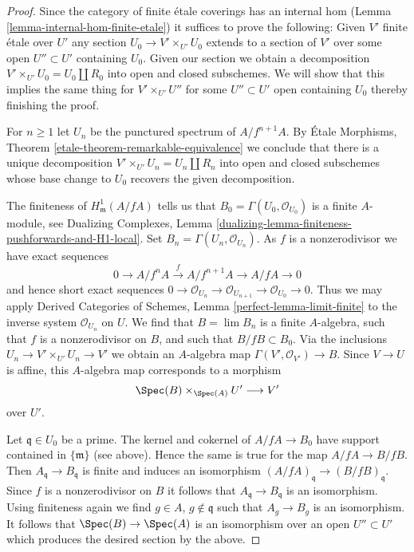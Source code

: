\begin{proof}
Since the category of finite \'etale coverings has an internal hom
(Lemma \ref{lemma-internal-hom-finite-etale})
it suffices to prove the following: Given $V'$ finite \'etale over $U'$
any section $U_0 \to V' \times_{U'} U_0$ extends to a section of $V'$
over some open $U'' \subset U'$ containing $U_0$.
Given our section we obtain a decomposition
$V' \times_{U'} U_0 = U_0 \amalg R_0$ into open and closed subschemes.
We will show that this implies the same thing for $V' \times_{U'} U''$
for some $U'' \subset U'$ open containing $U_0$ thereby
finishing the proof.

\medskip\noindent
For $n \geq 1$ let $U_n$ be the punctured spectrum of $A/f^{n + 1}A$. By
\'Etale Morphisms, Theorem \ref{etale-theorem-remarkable-equivalence}
we conclude that there is a unique decomposition
$V' \times_{U'} U_n = U_n \amalg R_n$
into open and closed subschemes whose base change to $U_0$ recovers
the given decomposition.

\medskip\noindent
The finiteness of $H^1_\mathfrak m(A/fA)$ tells us that
$B_0 = \Gamma(U_0, \mathcal{O}_{U_0})$ is a finite $A$-module, see
Dualizing Complexes, Lemma
\ref{dualizing-lemma-finiteness-pushforwards-and-H1-local}.
Set $B_n = \Gamma(U_n, \mathcal{O}_{U_n})$.
As $f$ is a nonzerodivisor we have exact sequences
$$
0 \to A/f^nA \xrightarrow{f} A/f^{n + 1}A \to A/fA \to 0
$$
and hence short exact sequences $0 \to \mathcal{O}_{U_n} \to
\mathcal{O}_{U_{n + 1}} \to \mathcal{O}_{U_0} \to 0$.
Thus we may apply Derived Categories of Schemes, Lemma
\ref{perfect-lemma-limit-finite}
to the inverse system $\mathcal{O}_{U_n}$ on $U$.
We find that $B = \lim B_n$ is a finite $A$-algebra, such that
$f$ is a nonzerodivisor on $B$,
and such that $B/fB \subset B_0$.
Via the inclusions $U_n \to V' \times_{U'} U_n \to V'$
we obtain an $A$-algebra map $\Gamma(V', \mathcal{O}_{V'}) \to B$.
Since $V \to U$ is affine, this $A$-algebra map corresponds to
a morphism
$$
\Spec(B) \times_{\Spec(A)} U' \longrightarrow V'
$$
over $U'$.

\medskip\noindent
Let $\mathfrak q \in U_0$ be a prime. The kernel and cokernel of
$A/fA \to B_0$ have support contained in $\{\mathfrak m\}$ (see above).
Hence the same is true for the map $A/fA \to B/fB$.
Then $A_\mathfrak q \to B_\mathfrak q$ is finite and
induces an isomorphism $(A/fA)_\mathfrak q \to (B/fB)_\mathfrak q$.
Since $f$ is a nonzerodivisor on $B$ it follows that
$A_\mathfrak q \to B_\mathfrak q$ is an isomorphism.
Using finiteness again we find $g \in A$, $g \not \in \mathfrak q$
such that $A_g \to B_g$ is an isomorphism.
It follows that $\Spec(B) \to \Spec(A)$ is an
isomorphism over an open $U'' \subset U'$ which produces
the desired section by the above.
\end{proof}
